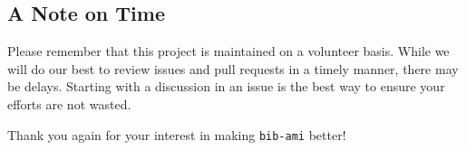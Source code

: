 \documentclass[11pt, a4paper]{article}
\begin{document}
\subsection*{A Note on Time}

Please remember that this project is maintained on a volunteer basis.
While we will do our best to review issues and pull requests in a timely manner, there may be delays.
Starting with a discussion in an issue is the best way to ensure your efforts are not wasted.

Thank you again for your interest in making \texttt{bib-ami} better!
\end{document}

